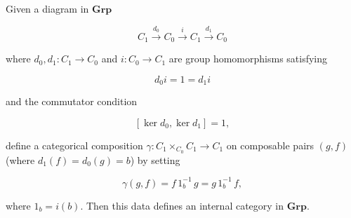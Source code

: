 Given a diagram in $\mathbf{Grp}$

$$C_1 \xrightarrow{d_0} C_0 \xrightarrow{i} C_1 \xrightarrow{d_1} C_0$$

where $d_0, d_1 : C_1 \rightarrow C_0$ and $i : C_0 \rightarrow C_1$ are group homomorphisms satisfying

$$d_0 i = 1 = d_1 i$$

and the commutator condition

$$[\ker d_0, \ker d_1] = 1,$$

define a categorical composition $\gamma : C_1 \times_{C_0} C_1 \rightarrow C_1$ on composable pairs $(g, f)$ (where $d_1(f) = d_0(g) = b$) by setting

$$\gamma(g, f) = f \, 1_b^{-1} \, g = g \, 1_b^{-1} \, f,$$

where $1_b = i(b)$. Then this data defines an internal category in $\mathbf{Grp}$.
